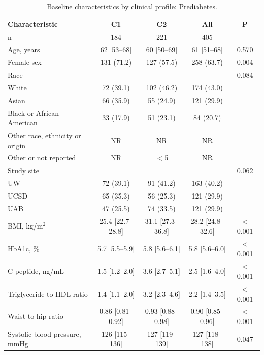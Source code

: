 \begin{table}[htbp]
\centering
\footnotesize
\caption{Baseline characteristics by clinical profile: Prediabetes.}
\label{tab:baseline-pre_diabetes}
\begin{tabular}{lcccc}
\toprule
Characteristic & C1 & C2 & All & P \\
\midrule
n & 184 & 221 & 405 &  \\
Age, years & 62 [53--68] & 60 [50--69] & 61 [51--68] & 0.570 \\
Female sex & 131 (71.2) & 127 (57.5) & 258 (63.7) & 0.004 \\
Race &  &  &  & 0.084 \\
\hspace{1em}White & 72 (39.1) & 102 (46.2) & 174 (43.0) &  \\
\hspace{1em}Asian & 66 (35.9) & 55 (24.9) & 121 (29.9) &  \\
\hspace{1em}Black or African American & 33 (17.9) & 51 (23.1) & 84 (20.7) &  \\
\hspace{1em}Other race, ethnicity or origin & NR & NR & NR &  \\
\hspace{1em}Other or not reported & NR & $<$5 & NR &  \\
Study site &  &  &  & 0.062 \\
\hspace{1em}UW & 72 (39.1) & 91 (41.2) & 163 (40.2) &  \\
\hspace{1em}UCSD & 65 (35.3) & 56 (25.3) & 121 (29.9) &  \\
\hspace{1em}UAB & 47 (25.5) & 74 (33.5) & 121 (29.9) &  \\
BMI, kg/m$^2$ & 25.4 [22.7--28.8] & 31.1 [27.3--36.8] & 28.2 [24.8--32.6] & $<$0.001 \\
HbA1c, \% & 5.7 [5.5--5.9] & 5.8 [5.6--6.1] & 5.8 [5.6--6.0] & $<$0.001 \\
C-peptide, ng/mL & 1.5 [1.2--2.0] & 3.6 [2.7--5.1] & 2.5 [1.6--4.0] & $<$0.001 \\
Triglyceride-to-HDL ratio & 1.4 [1.1--2.0] & 3.2 [2.3--4.6] & 2.2 [1.4--3.5] & $<$0.001 \\
Waist-to-hip ratio & 0.86 [0.81--0.92] & 0.93 [0.88--0.98] & 0.90 [0.85--0.96] & $<$0.001 \\
Systolic blood pressure, mmHg & 126 [115--136] & 127 [119--139] & 127 [118--138] & 0.047 \\

\end{tabular}
\end{table}

